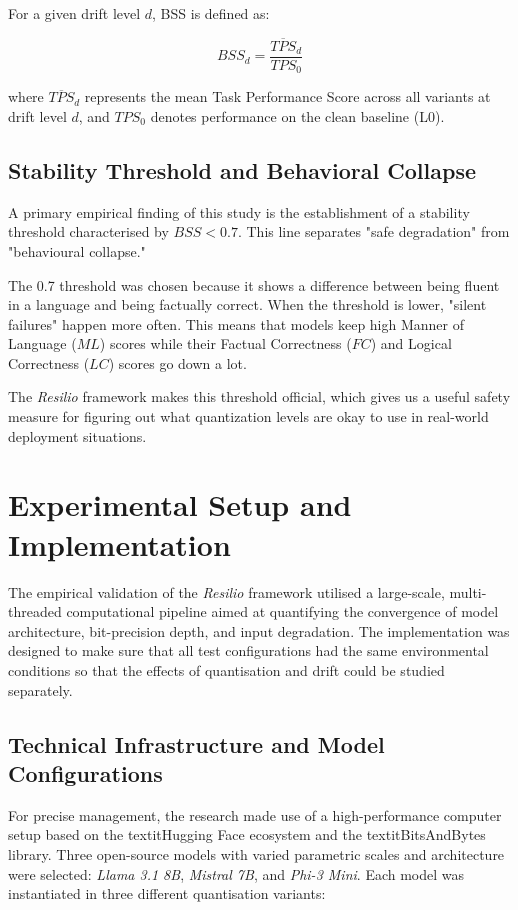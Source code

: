 \documentclass[conference]{IEEEtran}
\begin{document}
For a given drift level $d$, BSS is defined as:

\begin{equation}
BSS_d = \frac{\overline{TPS}_d}{TPS_0}
\end{equation}

where $\overline{TPS}_d$ represents the mean Task Performance Score across all variants at drift level $d$, and $TPS_0$ denotes performance on the clean baseline (L0).

\subsection{Stability Threshold and Behavioral Collapse}

A primary empirical finding of this study is the establishment of a stability threshold characterised by $BSS < 0.7$. This line separates "safe degradation" from "behavioural collapse."

The 0.7 threshold was chosen because it shows a difference between being fluent in a language and being factually correct. When the threshold is lower, "silent failures" happen more often. This means that models keep high Manner of Language ($ML$) scores while their Factual Correctness ($FC$) and Logical Correctness ($LC$) scores go down a lot.

The \textit{Resilio} framework makes this threshold official, which gives us a useful safety measure for figuring out what quantization levels are okay to use in real-world deployment situations.


\section{Experimental Setup and Implementation}

The empirical validation of the \textit{Resilio} framework utilised a large-scale, multi-threaded computational pipeline aimed at quantifying the convergence of model architecture, bit-precision depth, and input degradation. The implementation was designed to make sure that all test configurations had the same environmental conditions so that the effects of quantisation and drift could be studied separately.
\subsection{Technical Infrastructure and Model Configurations}

For precise management, the research made use of a high-performance computer setup based on the textit{Hugging Face} ecosystem and the textit{BitsAndBytes} library. Three open-source models with varied parametric scales and architecture were selected: \textit{Llama 3.1 8B}, \textit{Mistral 7B}, and \textit{Phi-3 Mini}. Each model was instantiated in three different quantisation variants:
\end{document}
